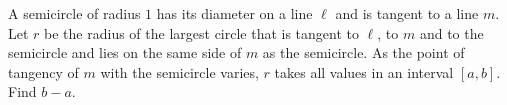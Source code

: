 A semicircle of radius $1$ has its diameter on a line $\ell$ and is tangent to a line $m$. Let $r$ be the radius of the largest circle that is tangent to $\ell$, to $m$ and to the semicircle and lies on the same side of $m$ as the semicircle. As the point of tangency of $m$ with the semicircle varies, $r$ takes all values in an interval $[a,b]$. Find $b-a$.
